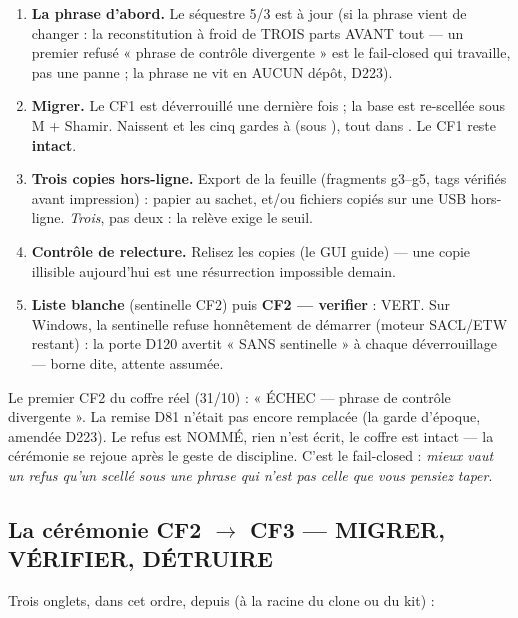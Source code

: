\begin{enumerate}
\item \textbf{La phrase d'abord.} Le séquestre 5/3 est à jour (si la phrase vient de
changer : la reconstitution à froid de TROIS parts AVANT tout — un premier
 refusé « phrase de contrôle divergente » est le fail-closed qui
travaille, pas une panne ; la phrase ne vit en AUCUN dépôt, D223).
\item \textbf{Migrer.} Le CF1 est déverrouillé une dernière fois ; la base est
re-scellée sous M + Shamir. Naissent  et les cinq gardes
 à  (sous ), tout dans . Le CF1
reste \textbf{intact}.
\item \textbf{Trois copies hors-ligne.} Export de la feuille (fragments g3--g5, tags
vérifiés avant impression) : papier au sachet, et/ou fichiers  copiés sur
une USB hors-ligne. \emph{Trois}, pas deux : la relève exige le seuil.
\item \textbf{Contrôle de relecture.} Relisez les copies (le GUI guide) — une copie
illisible aujourd'hui est une résurrection impossible demain.
\item \textbf{Liste blanche} (sentinelle CF2) puis \textbf{CF2 — verifier} : VERT.
Sur Windows, la sentinelle refuse honnêtement de démarrer (moteur SACL/ETW restant) :
la porte D120 avertit « SANS sentinelle » à chaque déverrouillage — borne dite,
attente assumée.
\end{enumerate}

\begin{terrain}
Le premier  CF2 du coffre réel (31/10) : « ÉCHEC — phrase de contrôle
divergente ». La remise D81 n'était pas encore remplacée (la garde d'époque, amendée D223). Le refus est NOMMÉ, rien
n'est écrit, le coffre est intact — la cérémonie se rejoue après le geste de
discipline. C'est le fail-closed : \emph{mieux vaut un refus qu'un scellé sous une
phrase qui n'est pas celle que vous pensiez taper}.
\end{terrain}

\subsection{La cérémonie CF2 $\to$ CF3 — MIGRER, VÉRIFIER, DÉTRUIRE}\label{sec:cercf3}

Trois onglets, dans cet ordre, depuis  (à la racine du
clone ou du kit) :

